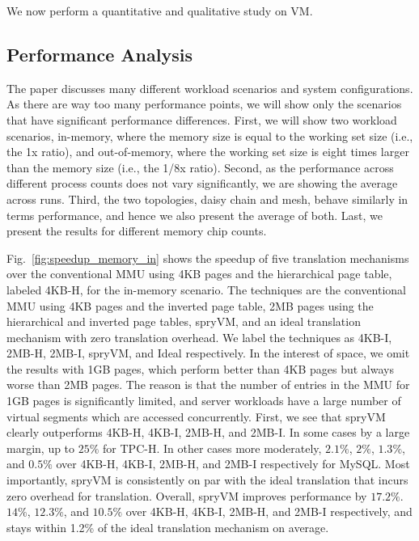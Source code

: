  


We now perform a quantitative and qualitative study on VM.

\subsection{Performance Analysis}

The paper discusses many different workload scenarios and system configurations. As there are way too many performance points, we will show only the scenarios that have significant performance differences. First, we will show two workload scenarios, in-memory, where the memory size is equal to the working set size (i.e., the 1x ratio), and out-of-memory, where the working set size is eight times larger than the memory size (i.e., the 1/8x ratio). Second, as the performance across different process counts does not vary significantly, we are showing the average across runs. Third, the two topologies, daisy chain and mesh, behave similarly in terms performance, and hence we also present the average of both. Last, we present the results for different memory chip counts.

Fig.~\ref{fig:speedup_memory_in} shows the speedup of five translation mechanisms over the conventional MMU using 4KB pages and the hierarchical page table, labeled 4KB-H, for the in-memory scenario. The techniques are the conventional MMU using 4KB pages and the inverted page table, 2MB pages using the hierarchical and inverted page tables, spryVM, and an ideal translation mechanism with zero translation overhead. We label the techniques as 4KB-I, 2MB-H, 2MB-I, spryVM, and Ideal respectively. In the interest of space, we omit the results with 1GB pages, which perform better than 4KB pages but always worse than 2MB pages. The reason is that the number of entries in the MMU for 1GB pages is significantly limited, and server workloads have a large number of virtual segments which are accessed concurrently. First, we see that spryVM clearly outperforms 4KB-H, 4KB-I, 2MB-H, and 2MB-I. In some cases by a large margin, up to $25\%$ for TPC-H. In other cases more moderately, $2.1\%$, $2\%$, $1.3\%$, and $0.5\%$ over 4KB-H, 4KB-I, 2MB-H, and 2MB-I respectively for MySQL. Most importantly, spryVM is consistently on par with the ideal translation that incurs zero overhead for translation. Overall, spryVM improves performance by $17.2\%$. $14\%$, $12.3\%$, and $10.5\%$ over 4KB-H, 4KB-I, 2MB-H, and 2MB-I respectively, and stays within 1.2\% of the ideal translation mechanism on average.

